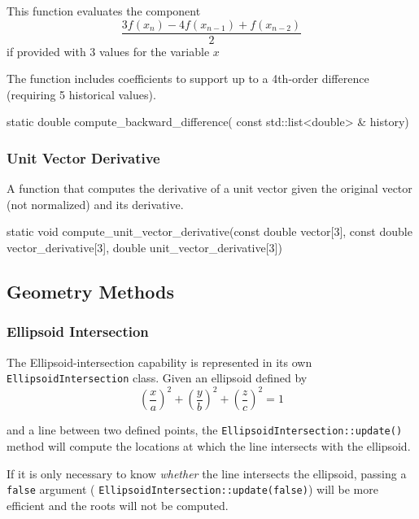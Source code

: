 \documentclass[11pt,fleqn]{report}
\begin{document}
This function evaluates the component
\begin{equation*}
\frac{3 f(x_n) - 4f(x_{n-1}) + f(x_{n-2})} {2}
\end{equation*}
if provided with 3 values for the variable $x$

The function includes coefficients to support up to a 4th-order difference
(requiring 5 historical values).

\begin{code}
static double compute_backward_difference( const std::list<double> & history)
\end{code}

\subsubsection{Unit Vector Derivative}
A function that computes the derivative of a unit vector given the original
vector (not normalized) and its derivative.

\begin{code}
static void compute_unit_vector_derivative(const double vector[3],
                                           const double vector_derivative[3],
                                           double unit_vector_derivative[3])
\end{code}

\subsection{Geometry Methods}
\subsubsection{Ellipsoid Intersection}
The Ellipsoid-intersection capability is represented in its own
\texttt{EllipsoidIntersection} class. Given an ellipsoid defined by
\begin{equation*}
\left( \frac{x}{a} \right)^2 +
\left( \frac{y}{b} \right)^2 +
\left( \frac{z}{c} \right)^2= 1
\end{equation*}

and a line between two defined points, the
\texttt{EllipsoidIntersection::update()} method will compute the
locations at which the line intersects with the ellipsoid.

If it is only
necessary to know \textit{whether} the line intersects the ellipsoid,
passing a \texttt{false} argument (
\texttt{EllipsoidIntersection::update(false)}) will be more efficient and
the roots will not be computed.
\end{document}
